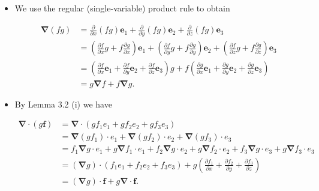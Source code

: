 \begin{formalproof}
  
\begin{itemize}
\item[(i)] We use the regular (single-variable) product rule to obtain

\[
\begin{aligned}
\boldsymbol{\nabla}(f g) & =\frac{\partial}{\partial x}(f g) \boldsymbol{e}_1+\frac{\partial}{\partial y}(f g) \boldsymbol{e}_2+\frac{\partial}{\partial z}(f g) \boldsymbol{e}_3 \\
& =\left(\frac{\partial f}{\partial x} g+f \frac{\partial g}{\partial x}\right) \boldsymbol{e}_1+\left(\frac{\partial f}{\partial y} g+f \frac{\partial g}{\partial y}\right) \boldsymbol{e}_2+\left(\frac{\partial f}{\partial z} g+f \frac{\partial g}{\partial z}\right) \boldsymbol{e}_3 \\
& =\left(\frac{\partial f}{\partial x} \boldsymbol{e}_1+\frac{\partial f}{\partial y} \boldsymbol{e}_2+\frac{\partial f}{\partial z} \boldsymbol{e}_3\right) g+f\left(\frac{\partial g}{\partial x} \boldsymbol{e}_1+\frac{\partial g}{\partial y} \boldsymbol{e}_2+\frac{\partial g}{\partial z} \boldsymbol{e}_3\right) \\
& =g \boldsymbol{\nabla} f+f \boldsymbol{\nabla} g .
\end{aligned}
\]

\item[(ii)] By Lemma 3.2 (i) we have

\[
\begin{aligned}
\boldsymbol{\nabla} \cdot(g \boldsymbol{f}) & =\boldsymbol{\nabla} \cdot\left(g f_1 e_1+g f_2 e_2+g f_3 e_3\right) \\
& =\boldsymbol{\nabla}\left(g f_1\right) \cdot e_1+\boldsymbol{\nabla}\left(g f_2\right) \cdot e_2+\boldsymbol{\nabla}\left(g f_3\right) \cdot e_3 \\
& =f_1 \boldsymbol{\nabla} g \cdot e_1+g \boldsymbol{\nabla} f_1 \cdot e_1+f_2 \boldsymbol{\nabla} g \cdot e_2+g \boldsymbol{\nabla} f_2 \cdot e_2+f_3 \boldsymbol{\nabla} g \cdot e_3+g \boldsymbol{\nabla} f_3 \cdot e_3 \\
& =(\boldsymbol{\nabla} g) \cdot\left(f_1 e_1+f_2 e_2+f_3 e_3\right)+g\left(\frac{\partial f_1}{\partial x}+\frac{\partial f_2}{\partial y}+\frac{\partial f_3}{\partial z}\right) \\
& =(\boldsymbol{\nabla} g) \cdot \boldsymbol{f}+g \boldsymbol{\nabla} \cdot \boldsymbol{f} .
\end{aligned}
\]


\end{itemize}
\end{formalproof}
